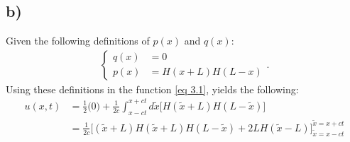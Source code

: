 \documentclass{article}
\begin{document}
\subsection*{b)}
Given the following definitions of $p(x)$ and $q(x)$:
\begin{align*}
    \begin{cases}
        q(x) &= 0\\
        p(x) &= H(x+L)H(L-x)
    \end{cases}.
\end{align*}Using these definitions in the function \eqref{eq 3.1}, yields the following:
\begin{align*}
    u(x,t) &= \frac{1}{2}\Big(0\Big) + \frac{1}{2c}\int_{x-ct}^{x+ct}d\tilde{x}\Big[H(\tilde{x} + L)H(L - \tilde{x})\Big]\\
    &=\frac{1}{2c}\Bigg[(\tilde{x}+L)H(\tilde{x}+L)H(L-\tilde{x}) + 2 L H(\tilde{x}-L)\Bigg]_{\tilde{x} = x-ct}^{\tilde{x} = x+ct}\\
\end{align*}
\end{document}
